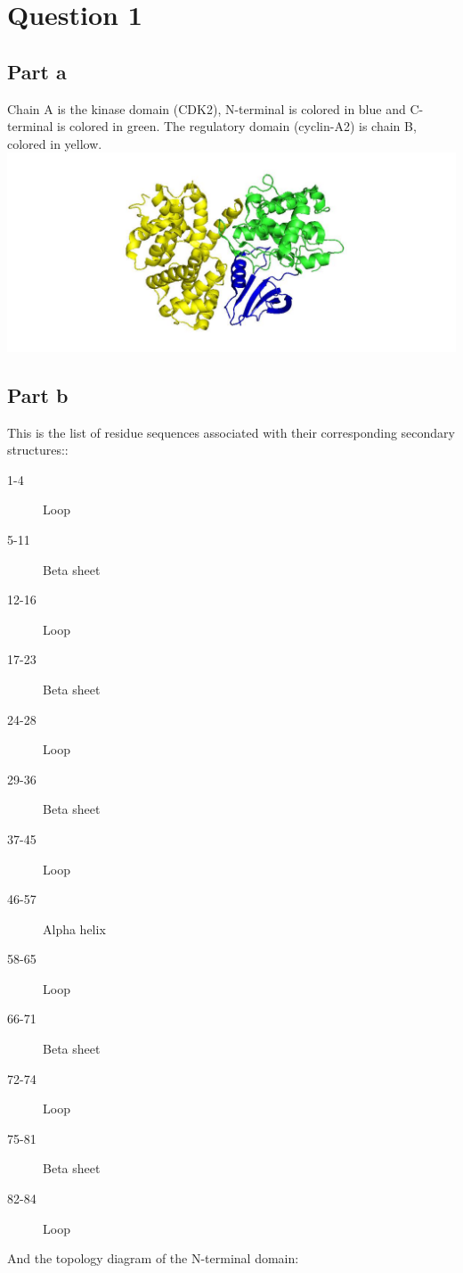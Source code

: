 \documentclass[11pt, a4paper,titlepage]{article}
\begin{document}

\setcounter{tocdepth}{3}

\tableofcontents
\newpage

\section*{Question 1}
\subsection*{Part a}

Chain A is the kinase domain (CDK2), N-terminal is colored in blue and
C-terminal is colored in green.  The regulatory domain (cyclin-A2) is
chain B, colored in yellow.
\includegraphics[width=15cm]{./Figures/1a.jpg}

\subsection*{Part b}

This is the list of residue sequences associated with their
corresponding secondary structures::
\begin{description}
\item[1-4] Loop
\item[5-11] Beta sheet
\item[12-16] Loop
\item[17-23] Beta sheet
\item[24-28] Loop
\item[29-36] Beta sheet
\item[37-45] Loop
\item[46-57] Alpha helix
\item[58-65] Loop
\item[66-71] Beta sheet
\item[72-74] Loop
\item[75-81] Beta sheet
\item[82-84] Loop
\end{description}
And the topology diagram of the N-terminal domain:
\end{document}
